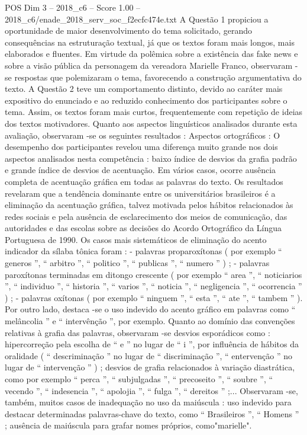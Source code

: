 \begin{textsample}{POS Dim 3 – 2018\_c6 – Score 1.00 – 2018\_c6/enade\_2018\_serv\_soc\_f2ecfc474e.txt}
A Questão 1 propiciou a oportunidade de maior desenvolvimento do tema solicitado, gerando consequências na estruturação textual, já que os textos foram mais longos, mais elaborados e fluentes.
Em virtude da polêmica sobre a existência das fake news e sobre a visão pública da personagem da vereadora Marielle Franco, observaram -se respostas que polemizaram o tema, favorecendo a construção argumentativa do texto.
A Questão 2 teve um comportamento distinto, devido ao caráter mais expositivo do enunciado e ao reduzido conhecimento dos participantes sobre o tema.
Assim, os textos foram mais curtos, frequentemente com repetição de ideias dos textos motivadores.
Quanto aos aspectos linguísticos analisados durante esta avaliação, observaram -se os seguintes resultados : Aspectos ortográficos : O desempenho dos participantes revelou uma diferença muito grande nos dois aspectos analisados nesta competência : baixo índice de desvios da grafia padrão e grande índice de desvios de acentuação.
Em vários casos, ocorre ausência completa de acentuação gráfica em todas as palavras do texto.
Os resultados revelaram que a tendência dominante entre os universitários brasileiros é a eliminação da acentuação gráfica, talvez motivada pelos hábitos relacionados às redes sociais e pela ausência de esclarecimento dos meios de comunicação, das autoridades e das escolas sobre as decisões do Acordo Ortográfico da Língua Portuguesa de 1990.
Os casos mais sistemáticos de eliminação do acento indicador da sílaba tônica foram : - palavras proparoxítonas ( por exemplo “ generos ”, “ arbitro ”, “ politico ”, “ publicas ”, “ numero ” ) ; - palavras paroxítonas terminadas em ditongo crescente ( por exemplo “ area ”, “ noticiarios ”, “ individuo ”, “ historia ”, “ varios ”, “ noticia ”, “ negligencia ”, “ ocorrencia ” ) ; - palavras oxítonas ( por exemplo “ ninguem ”, “ esta ”, “ ate ”, “ tambem ” ).
Por outro lado, destaca -se o uso indevido do acento gráfico em palavras como “ melâncolia ” e “ intervênção ”, por exemplo.
Quanto ao domínio das convenções relativas à grafia das palavras, observaram -se desvios esporádicos como : hipercorreção pela escolha de “ e ” no lugar de “ i ”, por influência de hábitos da oralidade ( “ descriminação ” no lugar de “ discriminação ”, “ entervenção ” no lugar de “ intervenção ” ) ; desvios de grafia relacionados à variação diastrática, como por exemplo “ perca ”, “ subjulgadas ”, “ precoseito ”, “ soubre ”, “ vecendo ”, “ indesencia ”, “ apolojia ”, “ fulga ”, “ dereitos ” ;...
Observaram -se, também, muitos casos de inadequação no uso da maiúscula : uso indevido para destacar determinadas palavras-chave do texto, como “ Brasileiros ”, “ Homens ” ; ausência de maiúscula para grafar nomes próprios, como"marielle".

\end{textsample}
